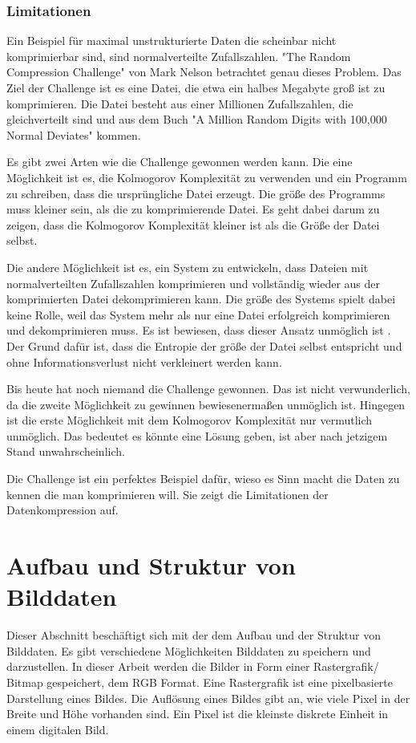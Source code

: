 \documentclass[conference]{IEEEtran}
\begin{document}
\subsubsection{Limitationen}

Ein Beispiel für maximal unstrukturierte Daten die scheinbar nicht komprimierbar 
sind, sind normalverteilte Zufallszahlen.
"The Random Compression Challenge" von Mark Nelson \cite{nelson} betrachtet genau dieses
Problem. 
Das Ziel der Challenge ist es eine Datei, die etwa ein halbes Megabyte groß ist 
zu komprimieren. 
Die Datei besteht aus einer Millionen Zufallszahlen, die gleichverteilt sind und 
aus dem Buch "A Million Random Digits with 100,000 Normal Deviates" \cite{amilli}
kommen. 

Es gibt zwei Arten wie die Challenge gewonnen werden kann.
Die eine Möglichkeit ist es, die Kolmogorov Komplexität zu verwenden und ein 
Programm zu schreiben, dass die ursprüngliche Datei erzeugt. 
Die größe des Programms muss kleiner sein, als die zu komprimierende Datei. 
Es geht dabei darum zu zeigen, dass die Kolmogorov Komplexität kleiner ist 
als die Größe der Datei selbst.

Die andere Möglichkeit ist es, ein System zu entwickeln, dass Dateien mit normalverteilten
Zufallszahlen komprimieren und vollständig wieder aus der komprimierten Datei 
dekomprimieren kann.
Die größe des Systems spielt dabei keine Rolle, weil das System mehr als nur eine 
Datei erfolgreich komprimieren und dekomprimieren muss.
Es ist bewiesen, dass dieser Ansatz unmöglich ist \cite{nelson}. 
Der Grund dafür ist, dass die Entropie der größe der Datei selbst entspricht und 
ohne Informationsverlust nicht verkleinert werden kann. 

Bis heute hat noch niemand die Challenge gewonnen. 
Das ist nicht verwunderlich, da
die zweite Möglichkeit zu gewinnen bewiesenermaßen unmöglich ist.
Hingegen ist die erste Möglichkeit mit dem Kolmogorov Komplexität nur 
vermutlich unmöglich.
Das bedeutet es könnte eine Lösung geben, ist aber nach jetzigem Stand unwahrscheinlich.

Die Challenge ist ein perfektes Beispiel dafür, wieso es Sinn macht die Daten zu 
kennen die man komprimieren will.
Sie zeigt die Limitationen der Datenkompression auf.


\section{Aufbau und Struktur von Bilddaten}

Dieser Abschnitt beschäftigt sich mit der dem Aufbau und der Struktur von Bilddaten.
Es gibt verschiedene Möglichkeiten Bilddaten zu speichern und darzustellen.
In dieser Arbeit werden die Bilder in Form einer Rastergrafik/ Bitmap gespeichert, dem
RGB Format.
Eine Rastergrafik ist eine pixelbasierte Darstellung eines Bildes.
Die Auflösung eines Bildes gibt an, wie viele Pixel in der Breite und Höhe vorhanden sind.
Ein Pixel ist die kleinste diskrete Einheit in einem digitalen Bild.
\end{document}
